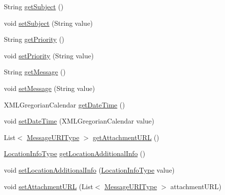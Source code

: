 \begin{DoxyCompactItemize}
String \hyperlink{classcom_1_1telefonica_1_1schemas_1_1unica_1_1rest_1_1mms_1_1v1_1_1MessageReferenceType_a085028b617ed3c106bed8925e59c2870}{getSubject} ()
\item 
void \hyperlink{classcom_1_1telefonica_1_1schemas_1_1unica_1_1rest_1_1mms_1_1v1_1_1MessageReferenceType_a1c41de5bc4d5acf1a9b08c1faee5918b}{setSubject} (String value)
\item 
String \hyperlink{classcom_1_1telefonica_1_1schemas_1_1unica_1_1rest_1_1mms_1_1v1_1_1MessageReferenceType_aefb1a1cf199ee03267544c6e5f78e248}{getPriority} ()
\item 
void \hyperlink{classcom_1_1telefonica_1_1schemas_1_1unica_1_1rest_1_1mms_1_1v1_1_1MessageReferenceType_a4781f89b11358ca00a8dae5ee3f5d953}{setPriority} (String value)
\item 
String \hyperlink{classcom_1_1telefonica_1_1schemas_1_1unica_1_1rest_1_1mms_1_1v1_1_1MessageReferenceType_a42d87fe3c466dfcb964efd54d9e1eb72}{getMessage} ()
\item 
void \hyperlink{classcom_1_1telefonica_1_1schemas_1_1unica_1_1rest_1_1mms_1_1v1_1_1MessageReferenceType_a5198205b60b9e90637c4f68293ac7bec}{setMessage} (String value)
\item 
XMLGregorianCalendar \hyperlink{classcom_1_1telefonica_1_1schemas_1_1unica_1_1rest_1_1mms_1_1v1_1_1MessageReferenceType_aeb83b2b086dd6d01e4a5337f74a1ed3a}{getDateTime} ()
\item 
void \hyperlink{classcom_1_1telefonica_1_1schemas_1_1unica_1_1rest_1_1mms_1_1v1_1_1MessageReferenceType_a004bd596c23d85c2f152eb9cbbc7cd0c}{setDateTime} (XMLGregorianCalendar value)
\item 
List$<$ \hyperlink{classcom_1_1telefonica_1_1schemas_1_1unica_1_1rest_1_1mms_1_1v1_1_1MessageURIType}{MessageURIType} $>$ \hyperlink{classcom_1_1telefonica_1_1schemas_1_1unica_1_1rest_1_1mms_1_1v1_1_1MessageReferenceType_aa592ca356b9b3c96450361157ac70bfd}{getAttachmentURL} ()
\item 
\hyperlink{classcom_1_1telefonica_1_1schemas_1_1unica_1_1rest_1_1mms_1_1v1_1_1LocationInfoType}{LocationInfoType} \hyperlink{classcom_1_1telefonica_1_1schemas_1_1unica_1_1rest_1_1mms_1_1v1_1_1MessageReferenceType_a3adc7d2c1c6dcbd5bcc430d40f8b10b9}{getLocationAdditionalInfo} ()
\item 
void \hyperlink{classcom_1_1telefonica_1_1schemas_1_1unica_1_1rest_1_1mms_1_1v1_1_1MessageReferenceType_a314814f37a4cdb5eaaa1b49c85c8c7ae}{setLocationAdditionalInfo} (\hyperlink{classcom_1_1telefonica_1_1schemas_1_1unica_1_1rest_1_1mms_1_1v1_1_1LocationInfoType}{LocationInfoType} value)
\item 
void \hyperlink{classcom_1_1telefonica_1_1schemas_1_1unica_1_1rest_1_1mms_1_1v1_1_1MessageReferenceType_a65f85a19d04d1fd203e027611d46b4f1}{setAttachmentURL} (List$<$ \hyperlink{classcom_1_1telefonica_1_1schemas_1_1unica_1_1rest_1_1mms_1_1v1_1_1MessageURIType}{MessageURIType} $>$ attachmentURL)
\end{DoxyCompactItemize}
